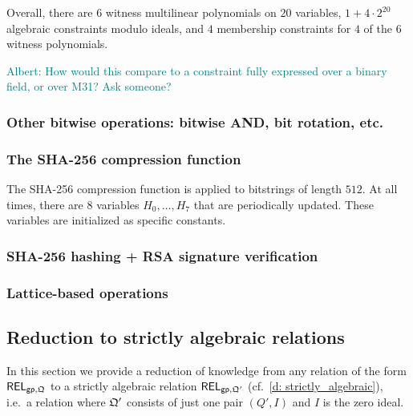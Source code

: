\documentclass[11pt,letterpaper,usenames,dvipsnames]{article}
\newcommand{\albert}[1]{\textcolor{teal}{Albert: {#1}}}
\begin{document}
    Overall, there are $6$ witness multilinear polynomials on $20$ variables, $1 +4\cdot 2^{20}$ algebraic constraints modulo ideals, and $4$ membership constraints for $4$ of the $6$ witness polynomials. 

    \albert{How would this compare to a constraint fully expressed over a binary field, or over M31? Ask someone? }
    
\subsubsection{Other bitwise operations: bitwise AND, bit rotation, etc.}

\subsubsection{The SHA-256 compression function}

The SHA-256 compression function is applied to bitstrings of length $512$. At all times, there are $8$ variables $H_0,\ldots, H_7$ that are periodically updated.  These variables are initialized as specific constants.




\subsubsection{SHA-256 hashing + RSA signature verification}

\subsubsection{Lattice-based operations}


\subsection{Reduction to strictly algebraic relations}

 In this section we provide a reduction of knowledge from  any relation of the form $\mathsf{REL}_{\mathsf{gp}, \mathfrak{Q}}$ to a strictly algebraic relation $\mathsf{REL}_{\mathsf{gp}, \mathfrak{Q}'}$ (cf.\ \cref{d: strictly_algebraic}), i.e.\ a relation where  $\mathfrak{Q}'$ consists of just one pair $(Q', I)$ and $I$ is the zero  ideal. 
\end{document}
